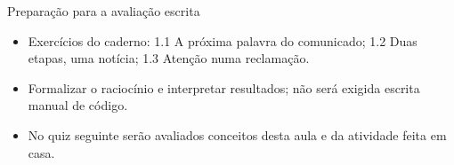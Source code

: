 \documentclass[10pt,aspectratio=169]{beamer}
\begin{document}
\begin{frame}[t]{Preparação para a avaliação escrita}
\small
\begin{itemize}
\item Exercícios do caderno: 1.1 A próxima palavra do comunicado; 1.2 Duas etapas, uma notícia; 1.3 Atenção numa reclamação.
\item Formalizar o raciocínio e interpretar resultados; não será exigida escrita manual de código.
\item No quiz seguinte serão avaliados conceitos desta aula e da atividade feita em casa.
\end{itemize}
\end{frame}
\end{document}
